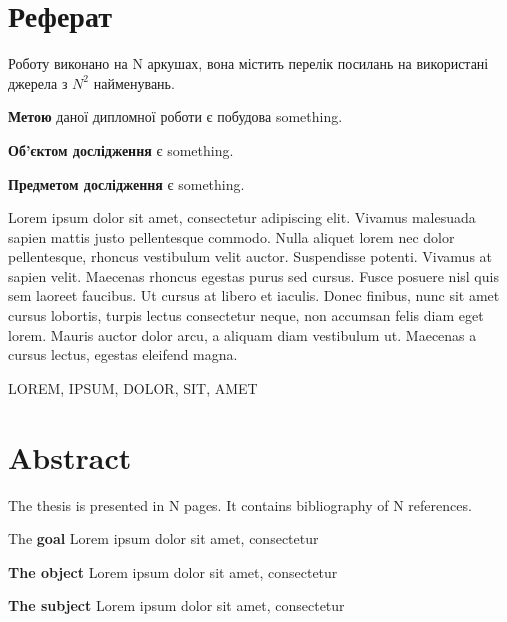 \chapter*{Реферат}
\pagestyle{empty}
\thispagestyle{empty}

Роботу виконано на N аркушах, вона містить перелік посилань на використані джерела з $N^2$ найменувань.

\textbf{Метою} даної дипломної роботи є побудова something.

\textbf{Об'єктом дослідження} є something.

\textbf{Предметом дослідження} є something.

Lorem ipsum dolor sit amet, consectetur adipiscing elit. Vivamus malesuada sapien mattis justo pellentesque commodo. 
Nulla aliquet lorem nec dolor pellentesque, rhoncus vestibulum velit auctor. Suspendisse potenti. Vivamus at sapien velit.
 Maecenas rhoncus egestas purus sed cursus. Fusce posuere nisl quis sem laoreet faucibus. Ut cursus at libero et iaculis. 
 Donec finibus, nunc sit amet cursus lobortis, turpis lectus consectetur neque, non accumsan felis diam eget lorem. Mauris 
 auctor dolor arcu, a aliquam diam vestibulum ut. Maecenas a cursus lectus, egestas eleifend magna.
 
\MakeUppercase{Lorem, ipsum, dolor, sit, amet}

\chapter*{Abstract}
\thispagestyle{empty}
The thesis is presented in N pages. It contains bibliography of N references.


The \textbf{goal} Lorem ipsum dolor sit amet, consectetur

\textbf{The object} Lorem ipsum dolor sit amet, consectetur

\textbf{The subject} Lorem ipsum dolor sit amet, consectetur


